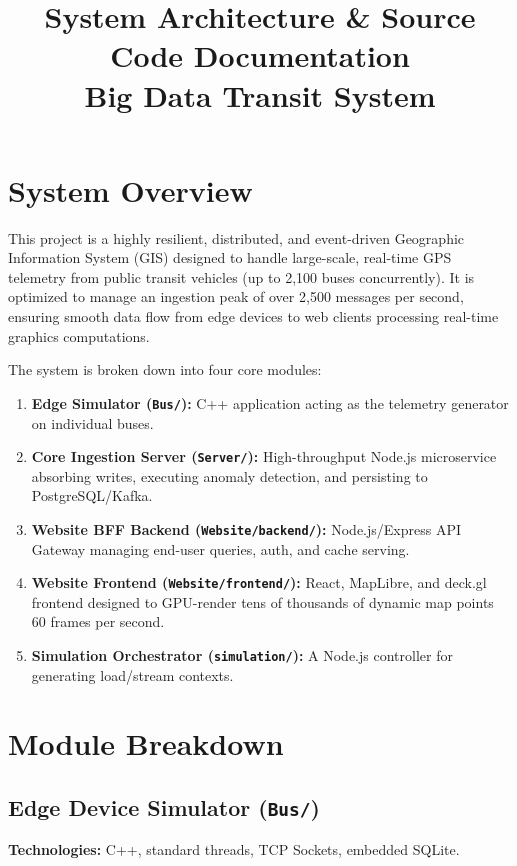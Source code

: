 \documentclass[12pt, a4paper]{article}
\title{\textbf{System Architecture \& Source Code Documentation}\\
\large Big Data Transit System}
\date{\vspace{-5ex}}
\begin{document}
\maketitle
\tableofcontents
\newpage

\section{System Overview}
This project is a highly resilient, distributed, and event-driven Geographic Information System (GIS) designed to handle large-scale, real-time GPS telemetry from public transit vehicles (up to 2,100 buses concurrently). It is optimized to manage an ingestion peak of over 2,500 messages per second, ensuring smooth data flow from edge devices to web clients processing real-time graphics computations.

The system is broken down into four core modules:
\begin{enumerate}
    \item \textbf{Edge Simulator (\texttt{Bus/}):} C++ application acting as the telemetry generator on individual buses.
    \item \textbf{Core Ingestion Server (\texttt{Server/}):} High-throughput Node.js microservice absorbing writes, executing anomaly detection, and persisting to PostgreSQL/Kafka.
    \item \textbf{Website BFF Backend (\texttt{Website/backend/}):} Node.js/Express API Gateway managing end-user queries, auth, and cache serving.
    \item \textbf{Website Frontend (\texttt{Website/frontend/}):} React, MapLibre, and deck.gl frontend designed to GPU-render tens of thousands of dynamic map points 60 frames per second.
    \item \textbf{Simulation Orchestrator (\texttt{simulation/}):} A Node.js controller for generating load/stream contexts.
\end{enumerate}

\section{Module Breakdown}

\subsection{Edge Device Simulator (\texttt{Bus/})}
\textbf{Technologies:} C++, standard threads, TCP Sockets, embedded SQLite.
\end{document}
